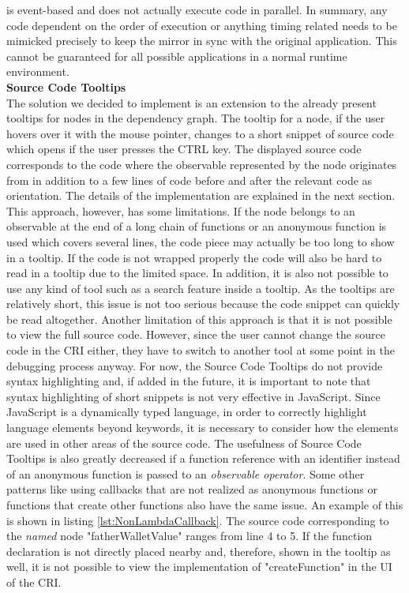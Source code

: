 is event-based \cite{EventBasedJS} and does not actually execute code in parallel. In summary, any code dependent on the order of execution or anything timing related needs to be mimicked precisely to keep the mirror in sync with the original application. This cannot be guaranteed for all possible applications in a normal runtime environment. \\
 
\noindent\textbf{Source Code Tooltips}\\
The solution we decided to implement is an extension to the already present tooltips for nodes in the dependency graph. The tooltip for a node, if the user hovers over it with the mouse pointer, changes to a short snippet of source code which opens if the user presses the CTRL key. The displayed source code corresponds to the code where the observable represented by the node originates from in addition to a few lines of code before and after the relevant code as orientation. The details of the implementation are explained in the next section. This approach, however, has some limitations. If the node belongs to an observable at the end of a long chain of functions or an anonymous function is used which covers several lines, the code piece may actually be too long to show in a tooltip. If the code is not wrapped properly the code will also be hard to read in a tooltip due to the limited space. In addition, it is also not possible to use any kind of tool such as a search feature inside a tooltip. As the tooltips are relatively short, this issue is not too serious because the code snippet can quickly be read altogether. Another limitation of this approach is that it is not possible to view the full source code. However, since the user cannot change the source code in the CRI either, they have to switch to another tool at some point in the debugging process anyway. For now, the Source Code Tooltips do not provide syntax highlighting and, if added in the future, it is important to note that syntax highlighting of short snippets is not very effective in JavaScript. Since JavaScript is a dynamically typed language, in order to correctly highlight language elements beyond keywords, it is necessary to consider how the elements are used in other areas of the source code. The usefulness of Source Code Tooltips is also greatly decreased if a function reference with an identifier instead of an anonymous function is passed to an \emph{observable operator}. Some other patterns like using callbacks that are not realized as anonymous functions or functions that create other functions also have the same issue. An example of this is shown in listing \ref{lst:NonLambdaCallback}. The source code corresponding to the \emph{named} node "fatherWalletValue" ranges from line 4 to 5. If the function declaration is not directly placed nearby and, therefore, shown in the tooltip as well, it is not possible to view the implementation of "createFunction" in the UI of the CRI.

